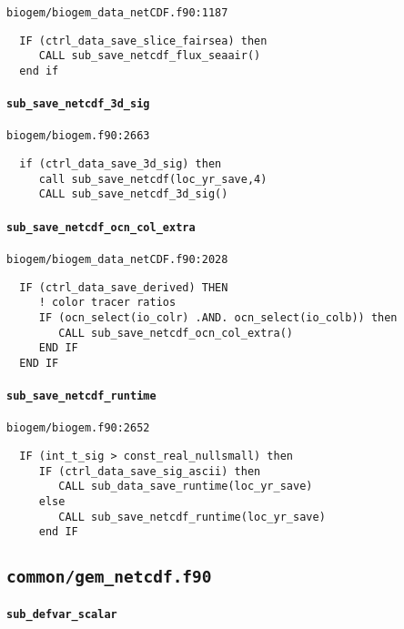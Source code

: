 \documentclass[a4paper,10pt,article]{memoir}
\begin{document}
\texttt{biogem/biogem\_data\_netCDF.f90:1187}

\begin{verbatim}
  IF (ctrl_data_save_slice_fairsea) then
     CALL sub_save_netcdf_flux_seaair()
  end if
\end{verbatim}

\paragraph{\texttt{sub\_save\_netcdf\_3d\_sig}}

\texttt{biogem/biogem.f90:2663}

\begin{verbatim}
  if (ctrl_data_save_3d_sig) then
     call sub_save_netcdf(loc_yr_save,4)
     CALL sub_save_netcdf_3d_sig()
\end{verbatim}

\paragraph{\texttt{sub\_save\_netcdf\_ocn\_col\_extra}}

\texttt{biogem/biogem\_data\_netCDF.f90:2028}

\begin{verbatim}
  IF (ctrl_data_save_derived) THEN
     ! color tracer ratios
     IF (ocn_select(io_colr) .AND. ocn_select(io_colb)) then
        CALL sub_save_netcdf_ocn_col_extra()
     END IF
  END IF
\end{verbatim}

\paragraph{\texttt{sub\_save\_netcdf\_runtime}}

\texttt{biogem/biogem.f90:2652}

\begin{verbatim}
  IF (int_t_sig > const_real_nullsmall) then
     IF (ctrl_data_save_sig_ascii) then
        CALL sub_data_save_runtime(loc_yr_save)
     else
        CALL sub_save_netcdf_runtime(loc_yr_save)
     end IF
\end{verbatim}


\subsection*{\texttt{common/gem\_netcdf.f90}}

\paragraph{\texttt{sub\_defvar\_scalar}}
\end{document}
